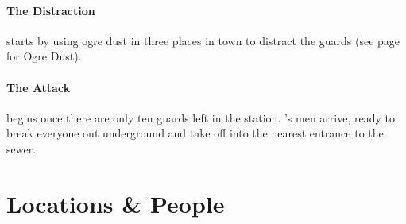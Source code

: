 \begin{multicols}{2}
\paragraph{The Distraction} starts by using ogre dust in three places in town to distract the guards (see page \pageref{ogredust} for Ogre Dust).

\paragraph{The Attack}
begins once there are only ten guards left in the station.
's men arrive, ready to break everyone out underground and take off into the nearest entrance to the sewer.


\stopcontents[sq]

\end{multicols}

\section{Locations \& People}

\label{redfall_map}

\subsection{}

